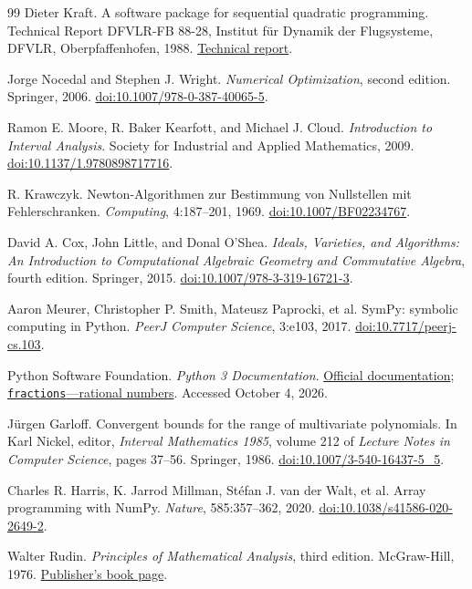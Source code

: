 \documentclass[11pt]{article}
\theoremstyle{remark}
\theoremstyle{plain}
\begin{document}
\begin{thebibliography}{99}
Dieter Kraft.
\newblock A software package for sequential quadratic programming.
\newblock Technical Report DFVLR-FB 88-28, Institut f\"ur Dynamik der
Flugsysteme, DFVLR, Oberpfaffenhofen, 1988.
\newblock \href{https://degenerateconic.com/uploads/2018/03/DFVLR_FB_88_28.pdf}{Technical report}.

Jorge Nocedal and Stephen J. Wright.
\newblock \emph{Numerical Optimization}, second edition.
\newblock Springer, 2006.
\newblock \href{https://doi.org/10.1007/978-0-387-40065-5}{doi:10.1007/978-0-387-40065-5}.

Ramon E. Moore, R. Baker Kearfott, and Michael J. Cloud.
\newblock \emph{Introduction to Interval Analysis}.
\newblock Society for Industrial and Applied Mathematics, 2009.
\newblock \href{https://doi.org/10.1137/1.9780898717716}{doi:10.1137/1.9780898717716}.

R. Krawczyk.
\newblock Newton-Algorithmen zur Bestimmung von Nullstellen mit Fehlerschranken.
\newblock \emph{Computing}, 4:187--201, 1969.
\newblock \href{https://doi.org/10.1007/BF02234767}{doi:10.1007/BF02234767}.

David A. Cox, John Little, and Donal O'Shea.
\newblock \emph{Ideals, Varieties, and Algorithms: An Introduction to
Computational Algebraic Geometry and Commutative Algebra}, fourth edition.
\newblock Springer, 2015.
\newblock \href{https://doi.org/10.1007/978-3-319-16721-3}{doi:10.1007/978-3-319-16721-3}.

Aaron Meurer, Christopher P. Smith, Mateusz Paprocki, et al.
\newblock SymPy: symbolic computing in Python.
\newblock \emph{PeerJ Computer Science}, 3:e103, 2017.
\newblock \href{https://doi.org/10.7717/peerj-cs.103}{doi:10.7717/peerj-cs.103}.

Python Software Foundation.
\newblock \emph{Python 3 Documentation}.
\newblock \href{https://docs.python.org/3/}{Official documentation};
\href{https://docs.python.org/3/library/fractions.html}{\nolinkurl{fractions}---rational numbers}.
\newblock Accessed October 4, 2026.

J\"urgen Garloff.
\newblock Convergent bounds for the range of multivariate polynomials.
\newblock In Karl Nickel, editor, \emph{Interval Mathematics 1985},
volume 212 of \emph{Lecture Notes in Computer Science}, pages 37--56.
Springer, 1986.
\newblock \href{https://doi.org/10.1007/3-540-16437-5_5}{doi:10.1007/3-540-16437-5\_5}.

Charles R. Harris, K. Jarrod Millman, St{\'e}fan J. van der Walt, et al.
\newblock Array programming with NumPy.
\newblock \emph{Nature}, 585:357--362, 2020.
\newblock \href{https://doi.org/10.1038/s41586-020-2649-2}{doi:10.1038/s41586-020-2649-2}.

Walter Rudin.
\newblock \emph{Principles of Mathematical Analysis}, third edition.
\newblock McGraw-Hill, 1976.
\newblock \href{https://www.mheducation.co.uk/principles-of-mathematical-analysis-int-l-ed-9780070856134-emea}{Publisher's book page}.

\end{thebibliography}
\end{document}
